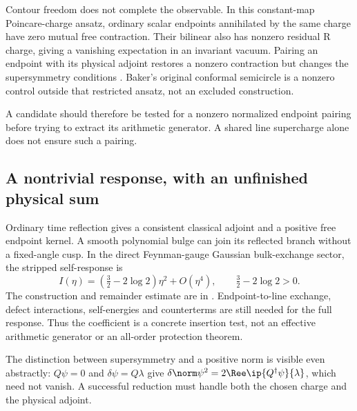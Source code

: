 Contour freedom does not complete the observable. In this
constant-map Poincare-charge ansatz, ordinary scalar endpoints
annihilated by the same charge have zero mutual free contraction.
Their bilinear also has nonzero residual R charge, giving a
vanishing expectation in an invariant vacuum. Pairing an endpoint
with its physical adjoint restores a nonzero contraction but changes
the supersymmetry conditions
\cite[Section~S6]{Supplement}. Baker's original conformal
semicircle is a nonzero control outside that restricted ansatz,
not an excluded construction.

A candidate should therefore be tested for a nonzero normalized
endpoint pairing before trying to extract its arithmetic generator.
A shared line supercharge alone does not ensure such a pairing.

\subsection{A nontrivial response, with an unfinished physical sum}

Ordinary time reflection gives a consistent classical adjoint and
a positive free endpoint kernel. A smooth polynomial bulge can
join its reflected branch without a fixed-angle cusp. In the
direct Feynman-gauge Gaussian bulk-exchange sector, the stripped
self-response is
\begin{equation}
 I(\eta)=\left(\tfrac32-2\log2\right)\eta^2+O(\eta^4),
 \qquad \tfrac32-2\log2>0.
\end{equation}
The construction and remainder estimate are in
\cite[Sections~S7--S8]{Supplement}.
Endpoint-to-line exchange, defect interactions, self-energies and
counterterms are still needed for the full response. Thus the
coefficient is a concrete insertion test, not an effective
arithmetic generator or an all-order protection theorem.

The distinction between supersymmetry and a positive norm is
visible even abstractly: $Q\psi=0$ and $\delta\psi=Q\lambda$
give $\delta\norm\psi^2=2\Ree\ip{Q^\dagger\psi}{\lambda}$,
which need not vanish. A successful reduction must handle both
the chosen charge and the physical adjoint.
